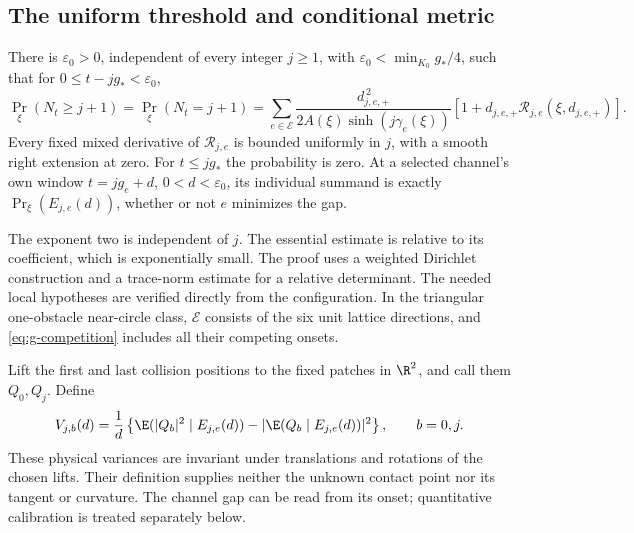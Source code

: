 \subsection{The uniform threshold and conditional metric}
\begin{theorem}
\label{thm:g-stability}
There is $\varepsilon_0>0$, independent of every integer $j\ge1$, with
$\varepsilon_0<\min_{K_0}g_*/4$, such that for
$0\le t-jg_*<\varepsilon_0$,
\begin{equation}\label{eq:g-competition}
 \Pr_\xi(N_t\ge j+1)=\Pr_\xi(N_t=j+1)
 =\sum_{e\in\mathcal E}
 \frac{d_{j,e,+}^{\,2}}{2A(\xi)\sinh(j\gamma_e(\xi))}
       [1+d_{j,e,+}\mathcal R_{j,e}(\xi,d_{j,e,+})].
\end{equation}
Every fixed mixed derivative of $\mathcal R_{j,e}$ is bounded uniformly
in $j$, with a smooth right extension at zero. For $t\le jg_*$ the
probability is zero. At a selected channel's own window $t=jg_e+d$,
$0<d<\varepsilon_0$, its individual summand is exactly
$\Pr_\xi(E_{j,e}(d))$, whether or not $e$ minimizes the gap.
\end{theorem}

The exponent two is independent of $j$. The essential estimate is
relative to its coefficient, which is exponentially small. The proof
uses a weighted Dirichlet construction and a trace-norm estimate for a
relative determinant. The needed local hypotheses are verified directly
from the configuration. In the triangular one-obstacle near-circle
class, $\mathcal E$ consists of the six unit lattice directions, and
\eqref{eq:g-competition} includes all their competing onsets.

Lift the first and last collision positions to the fixed patches in
$\R^2$, and call them $Q_0,Q_j$. Define
\begin{equation}\label{eq:v3-observed-variance}
 V_{j,b}(d)=\frac1d\left\{
 \E(|Q_b|^2\mid E_{j,e}(d))-
       |\E(Q_b\mid E_{j,e}(d))|^2\right\},\qquad b=0,j.
\end{equation}
These physical variances are invariant under translations and rotations
of the chosen lifts. Their definition supplies neither the unknown
contact point nor its tangent or curvature. The channel gap can be read
from its onset; quantitative calibration is treated separately below.

